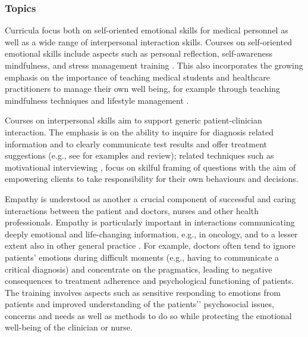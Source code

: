 \documentclass[prodmode,acmtochi]{acmsmall}
\newcommand{\todo}[1]{\textrm{\textrm{\textcolor{LightBlue}{[[#1]]}}}}
\newcommand{\GeraldineFIX}[1]{}
\newcommand{\GeraldineTODO}[1]{}
\begin{document}
\subsubsection*{Topics} 
Curricula focus both on self-oriented emotional skills for medical personnel as well as a wide range of interpersonal interaction skills. 
%
Courses on self-oriented emotional skills include aspects such as personal reflection, self-awareness mindfulness, and stress management training \cite{Shapiro2000,Epstein1999,Satterfield2007}. This also incorporates the growing emphasis on the importance of teaching medical students and healthcare practitioners to manage their own well being, for example through teaching mindfulness techniques and lifestyle management \cite{Hassed2009}.
\GeraldineTODO{G: add in sentence or two (maybe as above?)about self-care courses eg the mindfulness courses at Monash eg Hassed et al 2009 - ref in comment)}

        Courses on interpersonal skills aim to support generic patient-clinician interaction. The emphasis is on the ability to inquire for diagnosis related information and to clearly communicate test results and offer  treatment suggestions (e.g., see \cite{Kalet2004,Barth2011} for examples and review); related techniques such as  motivational interviewing \cite{Hettema2005},  focus on skilful framing of questions with the aim of empowering  clients to take responsibility for their own behaviours and decisions.  
%
        
Empathy is understood as another a crucial component of successful and caring interactions between the patient and doctors, nurses and other health professionals. Empathy is particularly important in interactions communicating deeply emotional and life-changing information, e.g., in oncology, and to a lesser extent also in other general practice \cite{Barth2011}.
                For example, doctors often tend to ignore patients' emotions during difficult moments (e.g., having to communicate a critical diagnosis) and concentrate on the pragmatics, leading to negative consequences to treatment adherence and psychological functioning of patients. The training involves aspects such as sensitive responding to emotions from patients and improved understanding of the patients'’ psychosocial issues, concerns and needs as well as methods to do so while protecting the emotional well-being of the clinician or nurse. 


\GeraldineFIX{ G: say what technology how used in a sentence???}
\GeraldineFIX{ G: this doesn't seem to be empathy but about self awareness/regulation?  ... P: Is this a bit better? 
I'm drawing on the reviews and the concerns they use in this space -- in my reading it is also around objectification of the patient etc... where regulation is obviously important, but also as a part of being able to emphasise in these cases without burn-out etc. .. I think it might be too complex to go into details here (especially given what a tangled mess empathy as a concept is :)}
\end{document}
